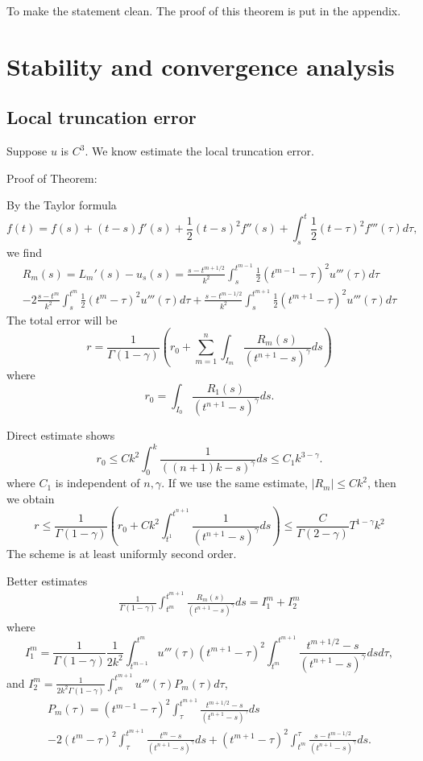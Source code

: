 \documentclass[11pt]{article} %
\begin{document}
To make the statement clean. The proof of this theorem is put in the appendix.




\section{Stability and convergence analysis}


\subsection{Local truncation error}
Suppose $u$ is $C^3$. We know estimate the local truncation error.

Proof of Theorem:

By the Taylor formula $$
f(t)=f(s)+(t-s)f'(s)+\frac{1}{2}(t-s)^2f''(s)+\int_s^t\frac{1}{2}(t-\tau)^2 f'''(\tau)d\tau,
$$
we find 
\begin{multline}
R_m(s)=L_m'(s)-u_s(s)=\frac{s-t^{m+1/2}}{k^2}\int_s^{t^{m-1}}\frac{1}{2}(t^{m-1}-\tau)^2 u'''(\tau)d\tau\\
-2\frac{s-t^m}{k^2}\int_s^{t^m}\frac{1}{2}(t^m-\tau)^2 u'''(\tau)d\tau
+\frac{s-t^{m-1/2}}{k^2}\int_s^{t^{m+1}}\frac{1}{2}(t^{m+1}-\tau)^2 u'''(\tau)d\tau
\end{multline}
The total error will be $$
r=\frac{1}{\Gamma(1-\gamma)}\left(r_0+\sum_{m=1}^n\int_{I_m}\frac{R_m(s)}{(t^{n+1}-s)^{\gamma}}ds\right)
$$
where $$
r_0=\int_{I_0}\frac{R_1(s)}{(t^{n+1}-s)^{\gamma}}ds.
$$

Direct estimate shows $$
r_0\le Ck^2\int_0^k\frac{1}{((n+1)k-s)^{\gamma}}ds\le C_1k^{3-\gamma}.
$$
where $C_1$ is independent of $n,\gamma$. If we use the same estimate, $|R_m|\le Ck^2$, then we obtain $$
r\le \frac{1}{\Gamma(1-\gamma)}(r_0+Ck^2\int_{t^1}^{t^{n+1}}\frac{1}{(t^{n+1}-s)^{\gamma}}ds)\le \frac{C}{\Gamma(2-\gamma)}T^{1-\gamma}k^2
$$
The scheme is at least uniformly second order.  

Better estimates 
\begin{gather*}
\frac{1}{\Gamma(1-\gamma)}\int_{t^m}^{t^{m+1}}\frac{R_m(s)}{(t^{n+1}-s)^{\gamma}}ds=I_1^m+I_2^m
\end{gather*}
where $$
I_1^m=\frac{1}{\Gamma(1-\gamma)}\frac{1}{2k^2}\int_{t^{m-1}}^{t^{m}}
u'''(\tau)(t^{m+1}-\tau)^2\int_{t^m}^{t^{m+1}}\frac{t^{m+1/2}-s}{(t^{n+1}-s)^{\gamma}}dsd\tau,
$$
and $I_2^m=\frac{1}{2k^2\Gamma(1-\gamma)}\int_{t^m}^{t^{m+1}}u'''(\tau)P_m(\tau)d\tau$,
\begin{multline*}
P_m(\tau)=(t^{m-1}-\tau)^2\int_{\tau}^{t^{m+1}}\frac{t^{m+1/2}-s}{(t^{n+1}-s)^{\gamma}}ds\\
-2(t^m-\tau)^2\int_{\tau}^{t^{m+1}}\frac{t^{m}-s}{(t^{n+1}-s)^{\gamma}}ds
+(t^{m+1}-\tau)^2\int_{t^m}^{\tau}\frac{s-t^{m-1/2}}{(t^{n+1}-s)^{\gamma}}ds.
\end{multline*}
\end{document}
